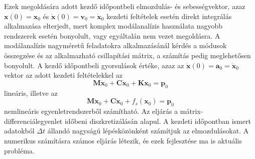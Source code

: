 Ezek megoldására adott kezdő időpontbeli elmozdulás- és sebességvektor, azaz $ \mathbf{x}(0) = \mathbf{x}_0$  és $\mathbf{\dot{x}}(0) = \mathbf{v}_0 = \mathbf{\dot{x}}_0$  kezdeti feltételek esetén direkt integrálás alkalmazása elterjedt, mert komplex modálanalízis használata nagyobb rendszerek esetén bonyolult, vagy egyáltalán nem vezet megoldásra. A modálanalízis nagyméretű feladatokra alkalmazásánál kérdés a módusok összegzése és az alkalmazható csillapítási mátrix, a számítás pedig meglehetősen bonyolult.  A kezdő időpontbeli gyorsulások értéke, azaz az $\mathbf{\ddot{x}}(0) = \mathbf{a}_0 = \mathbf{\ddot{x}}_0$ vektor az adott kezdeti feltételekkel az
%
\begin{equation}
\label{first_step_equation}
\mathbf{M}\mathbf{\ddot{x}}_0+\mathbf{C}\mathbf{\dot{x}}_0+\mathbf{K}\mathbf{x}_0=\mathbf{p}_{0}
\end{equation}
lineáris, illetve az
\begin{equation}
\label{first_step_equation_nl}
\mathbf{M}\mathbf{\ddot{x}}_0+\mathbf{C}\mathbf{\dot{x}}_0+f_s(\mathbf{x}_0)=\mathbf{p}_{0}
\end{equation}
%
 nemlineáris egyenletrendszerből számítható. Az eljárás a mátrix-differenciálegyenlet  időbeni  diszkretizálásán alapul. A kezdeti időpontban ismert adatokból $\Delta{t}$ állandó nagyságú lépésközönként számítjuk az elmozdulásokat. A numerikus számításra számos eljárás létezik, és ezek fejlesztése ma is aktuális probléma.
 

